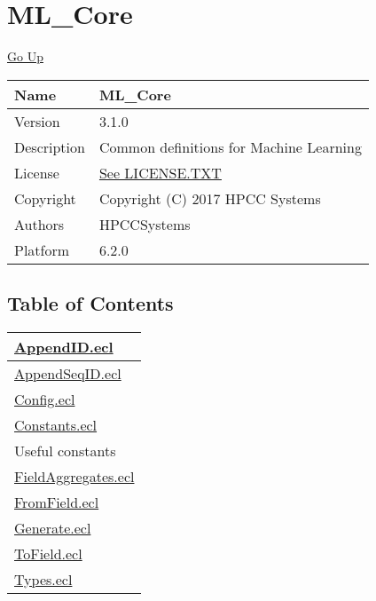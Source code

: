 \chapter*{\color{headtoc} ML\_Core}
\hypertarget{ecldoc:toc:root/ML_Core}{}
\hyperlink{ecldoc:toc:}{Go Up}

\begin{tabularx}{\textwidth}{|l|X|}
\hline
Name &
ML\_Core
 \\
\hline
Version &
3.1.0
 \\
\hline
Description &
Common definitions for Machine Learning
 \\
\hline
License &
\url{See LICENSE.TXT}
 \\
\hline
Copyright &
Copyright (C) 2017 HPCC Systems
 \\
\hline
Authors &
HPCCSystems
 \\
\hline
Platform &
6.2.0
 \\
\hline
\end{tabularx}

\section*{Table of Contents}
{\renewcommand{\arraystretch}{1.5}
\begin{longtable}{|p{\textwidth}|}
\hline
\hyperlink{ecldoc:toc:ML_Core.AppendID}{AppendID.ecl} \\
\hline
\hyperlink{ecldoc:toc:ML_Core.AppendSeqID}{AppendSeqID.ecl} \\
\hline
\hyperlink{ecldoc:toc:ML_Core.Config}{Config.ecl} \\
\hline
\hyperlink{ecldoc:toc:ML_Core.Constants}{Constants.ecl} \\
Useful constants \\
\hline
\hyperlink{ecldoc:toc:ML_Core.FieldAggregates}{FieldAggregates.ecl} \\
\hline
\hyperlink{ecldoc:toc:ML_Core.FromField}{FromField.ecl} \\
\hline
\hyperlink{ecldoc:toc:ML_Core.Generate}{Generate.ecl} \\
\hline
\hyperlink{ecldoc:toc:ML_Core.ToField}{ToField.ecl} \\
\hline
\hyperlink{ecldoc:toc:ML_Core.Types}{Types.ecl} \\
\hline
\end{longtable}
}











